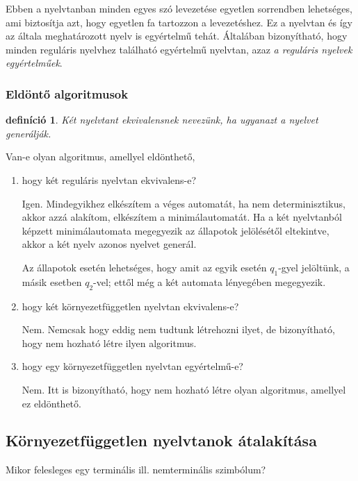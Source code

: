 \documentclass[a4paper]{article}
\newtheorem{definicio}{definíció}[section]
\begin{document}
Ebben a nyelvtanban minden egyes szó levezetése egyetlen sorrendben
lehetséges, ami biztosítja azt, hogy egyetlen fa tartozzon a
levezetéshez. Ez a nyelvtan és így az általa meghatározott nyelv is
egyértelmű tehát. Általában bizonyítható, hogy minden reguláris nyelvhez
található egyértelmű nyelvtan, azaz \emph{a reguláris nyelvek
egyértelműek}.

\subsubsection{Eldöntő algoritmusok}

\begin{definicio}
    \emph{Két nyelvtant ekvivalensnek} nevezünk, ha ugyanazt a nyelvet
    generálják.
\end{definicio}

Van-e olyan algoritmus, amellyel eldönthető,
\begin{enumerate}
    \item hogy két reguláris nyelvtan ekvivalens-e?

        Igen. Mindegyikhez elkészítem a véges automatát, ha nem
        determinisztikus, akkor azzá alakítom, elkészítem a
        minimálautomatát. Ha a két nyelvtanból képzett minimálautomata
        megegyezik az állapotok jelölésétől eltekintve, akkor a két
        nyelv azonos nyelvet generál.

        Az állapotok esetén lehetséges, hogy amit az egyik esetén
        $q_1$-gyel jelöltünk, a másik esetben $q_2$-vel; ettől még a két
        automata lényegében megegyezik.

    \item  hogy két környezetfüggetlen nyelvtan ekvivalens-e?

        Nem. Nemcsak hogy eddig nem tudtunk létrehozni ilyet, de
        bizonyítható, hogy nem hozható létre ilyen algoritmus.

    \item hogy egy környezetfüggetlen nyelvtan egyértelmű-e?

        Nem. Itt is bizonyítható, hogy nem hozható létre olyan
        algoritmus, amellyel ez eldönthető.
\end{enumerate}


\subsection{Környezetfüggetlen nyelvtanok átalakítása}

Mikor felesleges egy terminális ill. nemterminális szimbólum?
\end{document}
